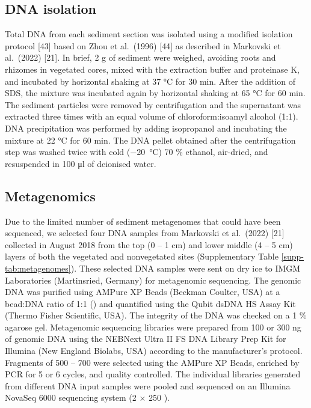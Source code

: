 \documentclass[
  12 pt,
]{article}
\begin{document}
\hypertarget{dna-isolation}{%
\subsection{DNA isolation}\label{dna-isolation}}

Total DNA from each sediment section was isolated using a modified isolation protocol {[}43{]} based on Zhou et al.~(1996) {[}44{]} as described in Markovski et al.~(2022) {[}21{]}. In brief, 2 \si{\gram} of sediment were weighed, avoiding roots and rhizomes in vegetated cores, mixed with the extraction buffer and proteinase K, and incubated by horizontal shaking at 37 \si{\degreeCelsius} for 30 \si{\minute}. After the addition of SDS, the mixture was incubated again by horizontal shaking at 65 \si{\degreeCelsius} for 60 \si{\minute}. The sediment particles were removed by centrifugation and the supernatant was extracted three times with an equal volume of chloroform:isoamyl alcohol (1:1). DNA precipitation was performed by adding isopropanol and incubating the mixture at 22 \si{\degreeCelsius} for 60 \si{\minute}. The DNA pellet obtained after the centrifugation step was washed twice with cold (\SI{-20}{\degreeCelsius}) 70 \si{\percent} ethanol, air-dried, and resuspended in 100 \si{\ul} of deionised water.

\hypertarget{metagenomics}{%
\subsection{Metagenomics}\label{metagenomics}}

Due to the limited number of sediment metagenomes that could have been sequenced, we selected four DNA samples from Markovski et al.~(2022) {[}21{]} collected in August 2018 from the top (0 -- 1 cm) and lower middle (4 -- 5 cm) layers of both the vegetated and nonvegetated sites (Supplementary Table \ref{supp-tab:metagenomes}). These selected DNA samples were sent on dry ice to IMGM Laboratories (Martinsried, Germany) for metagenomic sequencing. The genomic DNA was purified using AMPure XP Beads (Beckman Coulter, USA) at a bead:DNA ratio of 1:1 (\si{\vV}) and quantified using the Qubit dsDNA HS Assay Kit (Thermo Fisher Scientific, USA). The integrity of the DNA was checked on a 1 \si{\percent} agarose gel. Metagenomic sequencing libraries were prepared from 100 or 300 \si{\nano\gram} of genomic DNA using the NEBNext Ultra II FS DNA Library Prep Kit for Illumina (New England Biolabs, USA) according to the manufacturer's protocol. Fragments of 500 -- 700 \si{\bp} were selected using the AMPure XP Beads, enriched by PCR for 5 or 6 cycles, and quality controlled. The individual libraries generated from different DNA input samples were pooled and sequenced on an Illumina NovaSeq 6000 sequencing system (2 × 250 \si{\bp}).
\end{document}

